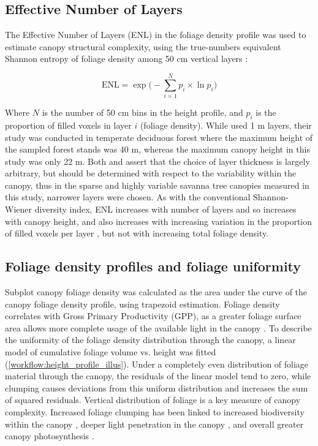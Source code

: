 \begin{refsection}
\subsection{Effective Number of Layers}

The Effective Number of Layers (ENL) in the foliage density profile was used to estimate canopy structural complexity, using the true-numbers equivalent Shannon entropy of foliage density among 50 cm vertical layers \citep{Ehbrecht2016}:

\begin{equation}
	\text{ENL} = \exp\Big(-\sum_{i=1}^{N} p_{i} \times \ln p_{i} \Big)
\end{equation}

Where $N$ is the number of 50 cm bins in the height profile, and $p_{i}$ is the proportion of filled voxels in layer $i$ (foliage density). While \citet{Ehbrecht2016} used 1 m layers, their study was conducted in temperate deciduous forest where the maximum height of the sampled forest stands was 40 m, whereas the maximum canopy height in this study was only 22 m. Both \citet{Ehbrecht2016} and \citet{Montes2004} assert that the choice of layer thickness is largely arbitrary, but should be determined with respect to the variability within the canopy, thus in the sparse and highly variable savanna tree canopies measured in this study, narrower layers were chosen. As with the conventional Shannon-Wiener diversity index, ENL increases with number of layers and so increases with canopy height, and also increases with increasing variation in the proportion of filled voxels per layer \citep{Jost2006}, but not with increasing total foliage density.

\subsection{Foliage density profiles and foliage uniformity}

Subplot canopy foliage density was calculated as the area under the curve of the canopy foliage density profile, using trapezoid estimation. Foliage density correlates with Gross Primary Productivity (GPP), as a greater foliage surface area allows more complete usage of the available light in the canopy \citep{Kotchenova2004}. To describe the uniformity of the foliage density distribution through the canopy, a linear model of cumulative foliage volume vs. height was fitted (\autoref{workflow:height_profile_illus}). Under a completely even distribution of foliage material through the canopy, the residuals of the linear model tend to zero, while clumping causes deviations from this uniform distribution and increases the sum of squared residuals. Vertical distribution of foliage is a key measure of canopy complexity. Increased foliage clumping has been linked to increased biodiversity within the canopy \citep{Ishii2004}, deeper light penetration in the canopy \citep{Beland2021a}, and overall greater canopy photosynthesis \citep{Baldocchi1986, Beland2021a}.


\end{refsection}
